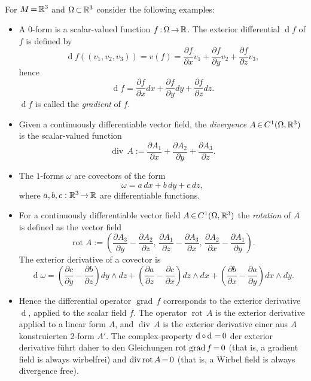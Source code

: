 \documentclass[11pt,twoside]{article}
\begin{document}
\paragraph{}
For ${M} {\,=\,} {\mathbb{R}}^3$ and $\Omega {\,\subset\,} {\mathbb{R}}^3$
consider the following examples:

\begin{itemize}[leftmargin=15pt]
\item[1.]
A $0$-form is a scalar-valued function $f {\,:\,} \Omega {\,\to\,} {\mathbb{R}}$.
The exterior differential $\operatorname{d}f$ of $f$ is defined by
\[
\operatorname{d}f((v_1,v_2,v_3)) = v(f) =
\frac{\partial f}{\partial x} v_1 +
\frac{\partial f}{\partial y} v_2 +
\frac{\partial f}{\partial z} v_3,
\]
hence
\[
\operatorname{d}f = \frac{\partial f}{\partial x} dx +
                    \frac{\partial f}{\partial y} dy +
                    \frac{\partial f}{\partial z} dz.
\]
$\operatorname{d} f$ is called the \textit{gradient} of $f$.

\item[2.]
Given a continuously differentiable vector field,
the \textit{divergence}
$A {\,\in\,} C^1(\Omega,{\mathbb{R}}^3)$ is the scalar-valued function
\[
\operatorname{div} \, A := \frac{\partial A_1}{\partial x} +
                           \frac{\partial A_2}{\partial y} +
                           \frac{\partial A_3}{\partial z}.
\]
\item[3.]
The $1$-forms $\omega$ are covectors of the form
\[
\omega = a \, dx + b \, dy + c \, dz,
\]
where $a,b,c:{\mathbb{R}}^3 {\,\to\,} {\mathbb{R}}$ are differentiable functions.

\item[4.]
For a continuously differentiable vector field $A {\,\in\,} C^1(\Omega,{\mathbb{R}}^3)$
the \textit{rotation} of $A$ is defined as the vector field
\[
\operatorname{rot} A :=
    (\frac{\partial A_3}{\partial y} - \frac{\partial A_2}{\partial z}, \,
     \frac{\partial A_1}{\partial z} - \frac{\partial A_3}{\partial x}, \,
     \frac{\partial A_2}{\partial x} - \frac{\partial A_1}{\partial y}).
\]
The exterior derivative of a covector is
\[
\operatorname{d} \omega =
(\frac{\partial c}{\partial y} - \frac{\partial b}{\partial z}) dy \wedge dz +
(\frac{\partial a}{\partial z} - \frac{\partial c}{\partial x}) dz \wedge dx +
(\frac{\partial b}{\partial x} - \frac{\partial a}{\partial y}) dx \wedge dy.
\]
\item[5.]
Hence the differential operator $\operatorname{grad} \, f$ corresponds to 
the exterior derivative $\operatorname{d}$,
applied to the scalar field $f$.
The operator $\operatorname{rot} \, A$ is the exterior derivative
applied to a linear form $A$,
and $\operatorname{div} \, A$ is the exterior derivative
einer aus $A$ konstruierten 2-form $A'$.
The complex-property $\operatorname{d} \circ \operatorname{d} {\,=\,} 0$
der exterior derivative f\"uhrt daher to den Gleichungen
$\operatorname{rot} \, \operatorname{grad} f {\,=\,} 0$
(that is, a gradient field is always wirbelfrei) and
$\operatorname{div} \operatorname{rot}  A {\,=\,} 0$
(that is, a Wirbel field is always divergence free).
\end{itemize}
\end{document}
